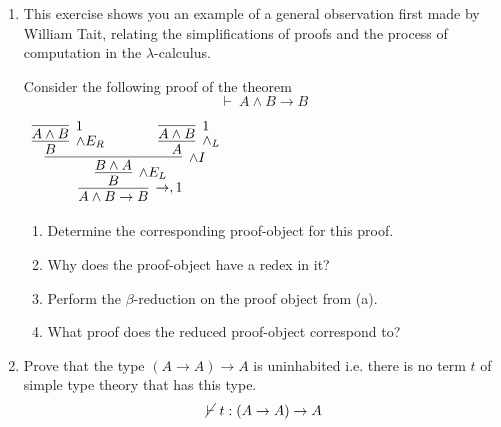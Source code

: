 \documentclass[11pt]{report}
\begin{document}
\begin{enumerate}
	\item This exercise shows you an example of a general observation first made by William Tait, relating the simplifications of proofs and the process of computation in the $\lambda$-calculus. 
	
	Consider the following proof of the theorem $$\vdash \ A \land B \to B$$
	
	\begin{center}
		$\begin{array}{c}		
		  \infer[\to, 1]{A \land B \to B}
		  	{\infer[\land E_{L}]{B}
				{\infer[\land I]{B \land A}
					{\infer[\land E_{R}]{B}{\infer[1]{A \land B}{}} 
					\hspace{0.5cm}	&	\hspace{0.5cm}
					\infer[\land_{L}]{A}{\infer[1]{A \land B}{}}}}}
		\end{array}$
	  \end{center}

	  	\begin{enumerate}
			\item Determine the corresponding proof-object for this proof. 
			\item Why does the proof-object have a redex in it? 
			\item Perform the $\beta$-reduction on the proof object from (a).
			\item What proof does the reduced proof-object correspond to?
		\end{enumerate} 

	\item Prove that the type $(A \to A) \to A$ is uninhabited i.e. there is no term $t$ of simple type theory that has this type.
	$$ \cancel{\vdash} \ t : (A \to A) \to A$$		

	 
\end{enumerate}
	
\end{document}
